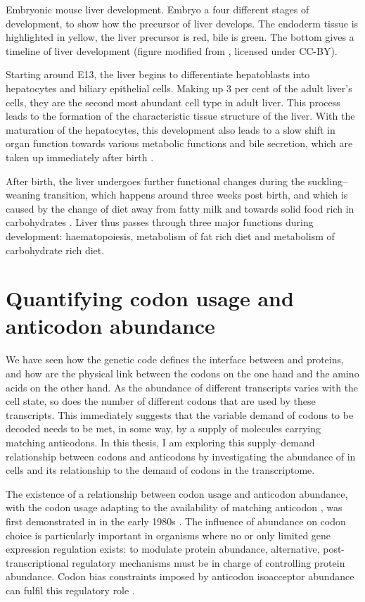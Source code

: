     {Embryonic mouse liver development.}
    {Embryo a four different stages of development, to show how the precursor of
    liver develops. The endoderm tissue is highlighted in yellow, the liver
    precursor is red, bile is green. The bottom gives a timeline of liver
    development (figure modified from \citet{Zorn:2008}, licensed under CC-BY).}

Starting around E13, the liver begins to differentiate hepatoblasts into
hepatocytes and biliary epithelial cells. Making up \num{3} per cent of the
adult liver’s cells, they are the second most abundant cell type in adult liver.
This process leads to the formation of the characteristic tissue structure of
the liver. With the maturation of the hepatocytes, this development also leads
to a slow shift in organ function towards various metabolic functions and bile
secretion, which are taken up immediately after birth \citep{Si-Tayeb:2010}.

After birth, the liver undergoes further functional changes during the
suckling–weaning transition, which happens around three weeks post birth, and
which is caused by the change of diet away from fatty milk and towards solid
food rich in carbohydrates \citep{Girard:1992}. Liver thus passes through three
major functions during development: haematopoiesis, metabolism of fat rich diet
and metabolism of carbohydrate rich diet.

\section{Quantifying codon usage and anticodon abundance}

We have seen how the genetic code defines the interface between \mrna and
proteins, and how \trna[s] are the physical link between the codons on the one
hand and the amino acids on the other hand. As the abundance of different \mrna
transcripts varies with the cell state, so does the number of different codons
that are used by these transcripts. This immediately suggests that the variable
demand of codons to be decoded needs to be met, in some way, by a supply of
\trna molecules carrying matching anticodons. In this thesis, I am exploring
this supply--demand relationship between codons and anticodons by investigating
the abundance of \trna[s] in cells and its relationship to the demand of codons
in the \mrna transcriptome.

The existence of a relationship between codon usage and anticodon abundance,
with the codon usage adapting to the availability of matching anticodon
\trna[s], was first demonstrated in  in the early 1980s
\citep{Ikemura:1981,Ikemura:1981a,Ikemura:1985}. The influence of \trna
abundance on codon choice is particularly important in organisms where no or
only limited gene expression regulation exists: to modulate protein abundance,
alternative, post-transcriptional regulatory mechanisms must be in charge of
controlling protein abundance. Codon bias constraints imposed by \trna anticodon
isoacceptor abundance can fulfil this regulatory role \citep{Horn:2008}.

